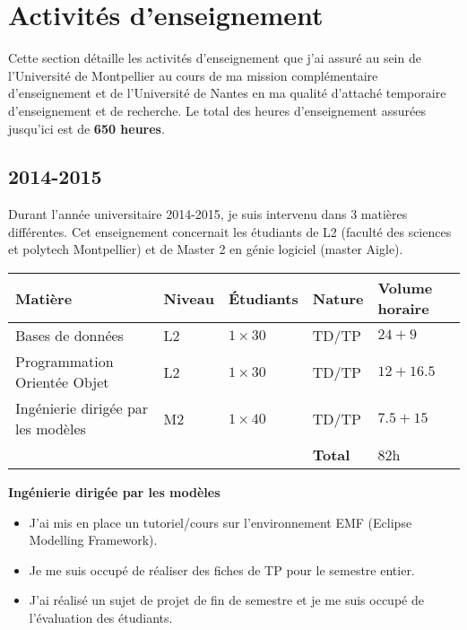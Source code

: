 \section{Activités d'enseignement}

Cette section détaille les activités d'enseignement que j'ai assuré au sein de l'Université de Montpellier au cours de ma mission complémentaire d’enseignement et de l'Université de Nantes en ma qualité d'attaché temporaire d’enseignement et de recherche. Le total des heures d'enseignement assurées jusqu'ici est de {\bf 650 heures}.

\subsection{2014-2015}

Durant l'année universitaire 2014-2015, je suis intervenu dans 3 matières différentes. Cet enseignement concernait les étudiants de L2 (faculté des sciences et polytech Montpellier) et de Master 2 en génie logiciel (master Aigle).   

\begin{tabular}{m{5cm}||m{1.3cm}m{1.7cm}m{2cm}m{3cm}} 
    \hline
    {\bf Matière}                      & {\bf Niveau} & {\bf Étudiants} & {\bf Nature} & {\bf Volume horaire} \\
    \hline
    Bases de données                   & L2 & $1\times30$ & TD/TP & $24 + 9$ \\
    Programmation Orientée Objet       & L2 & $1\times30$ & TD/TP & $12 + 16.5$ \\
    Ingénierie dirigée par les modèles & M2 & $1\times40$ & TD/TP & $7.5 +15$ \\
    \cline{4-5}
     & & & {\bf Total} & $82$h \\
    \hline
\end{tabular}

{\bf Ingénierie dirigée par les modèles}

    \begin{itemize}
        \item J'ai mis en place un tutoriel/cours sur l’environnement EMF (Eclipse Modelling Framework).
        \item Je me suis occupé de réaliser des fiches de TP pour le semestre entier.
        \item J'ai réalisé un sujet de projet de fin de semestre et je me suis occupé de l'évaluation des étudiants.
    \end{itemize}

